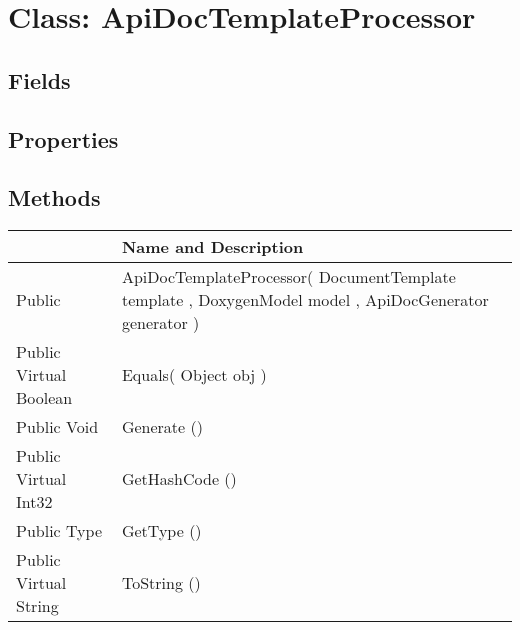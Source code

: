 \documentclass[11pt, oneside, a4paper]{book}
\begin{document}
\hypertarget{SoftwareEngineeringTools.{}Documentation.{}ApiDocTemplateProcessor}{}
\section{Class: ApiDocTemplateProcessor}

\subsection{Fields}

\subsection{Properties}

\subsection{Methods}
\begin{center}
\begin{tabular}{| p{3cm} | p{12cm} | }
\hline
\textbf{ } & \textbf{ Name and Description}\\
\hline
 Public  &  ApiDocTemplateProcessor(\hypertarget{SoftwareEngineeringTools.{}Documentation.{}ApiDocTemplateProcessor.{}ApiDocTemplateProcessor\_DocumentTemplate\_DoxygenModel\_ApiDocGenerator}{} DocumentTemplate  template  ,  DoxygenModel  model  ,  ApiDocGenerator  generator  )\\
\hline
 Public  Virtual  Boolean &  Equals(\hypertarget{SoftwareEngineeringTools.{}Documentation.{}ApiDocTemplateProcessor.{}Equals\_Object}{} Object  obj  )\\
\hline
 Public  Void &  Generate ()\hypertarget{SoftwareEngineeringTools.{}Documentation.{}ApiDocTemplateProcessor.{}Generate}{}\\
\hline
 Public  Virtual  Int32 &  GetHashCode ()\hypertarget{SoftwareEngineeringTools.{}Documentation.{}ApiDocTemplateProcessor.{}GetHashCode}{}\\
\hline
 Public  Type &  GetType ()\hypertarget{SoftwareEngineeringTools.{}Documentation.{}ApiDocTemplateProcessor.{}GetType}{}\\
\hline
 Public  Virtual  String &  ToString ()\hypertarget{SoftwareEngineeringTools.{}Documentation.{}ApiDocTemplateProcessor.{}ToString}{}\\
\hline
\end{tabular}
\end{center}
 
\end{document}
